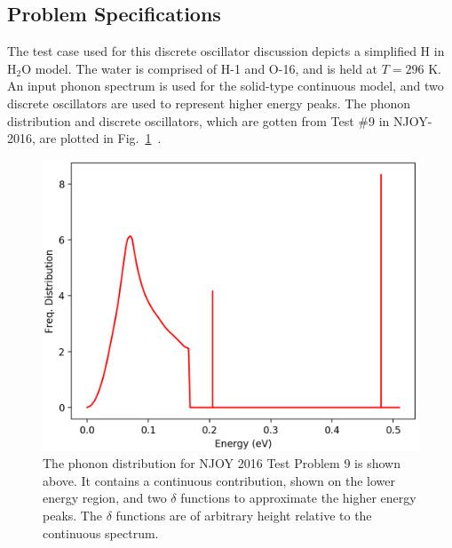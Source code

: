 \documentclass[Master.tex]{subfiles}
\begin{document}
  \subsection{Problem Specifications}\label{sec:test9}
    The test case used for this discrete oscillator discussion depicts a simplified H in H$_2$O model. The water is comprised of H-1 and O-16, and is held at $T=296$ K. An input phonon spectrum is used for the solid-type continuous model, and two discrete oscillators are used to represent higher energy peaks. The phonon distribution and discrete oscillators, which are gotten from Test \#9 in NJOY-2016, are plotted in Fig.~\ref{fig:waterPhonon}~\cite{njoy}. 
  \begin{figure}[h]
    \begin{center}
      \includegraphics[scale=0.7]{waterPhononDistb}
      \caption[Phonon Distribution for NJOY 2016 Test Problem 9]{The phonon distribution for NJOY 2016 Test Problem 9 is shown above. It contains a continuous contribution, shown on the lower energy region, and two $\delta$ functions to approximate the higher energy peaks. The $\delta$ functions are of arbitrary height relative to the continuous spectrum. }
      \label{fig:waterPhonon}
    \end{center}
  \end{figure}
\end{document}
